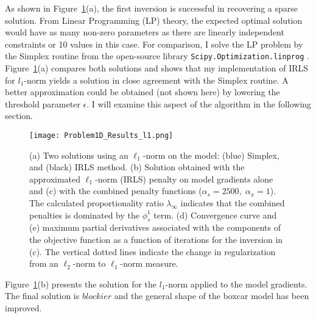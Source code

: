 As shown in Figure~\ref{Problem1D_l1Result}(a), the first inversion is successful in recovering a sparse solution. From Linear Programming (LP) theory, the expected optimal solution would have as many non-zero parameters as there are linearly independent constraints or 10 values in this case. For comparison, I solve the LP problem by the Simplex routine from the open-source library \texttt{Scipy.Optimization.linprog} \cite[]{Scipy2001}. Figure~\ref{Problem1D_l1Result}(a) compares both solutions and shows that my implementation of IRLS for $l_1$-norm yields a solution in close agreement with the Simplex routine. A better approximation could be obtained (not shown here) by lowering the threshold parameter $\epsilon$. I will examine this aspect of the algorithm in the following section.
\begin{figure}
\texttt{[image: Problem1D\_Results\_l1.png]}
\caption{(a) Two solutions using an $\ell_1$-norm on the model: (blue) Simplex, and (black) IRLS method. (b) Solution obtained with the approximated $\ell_1$-norm (IRLS) penalty on model gradients alone and (c) with the combined penalty functions ($\alpha_s=2500,\;\alpha_x = 1$). The calculated proportionality ratio $\lambda_\infty$ indicates that the combined penalties is dominated by the $\phi_s^1$ term. (d) Convergence curve and (e) maximum partial derivatives associated with the components of the objective function as a function of iterations for the inversion in (c). The vertical dotted lines indicate the change in regularization from an $\ell_2$-norm to $\ell_1$-norm measure.}
\label{Problem1D_l1Result}
\end{figure}
Figure~\ref{Problem1D_l1Result}(b) presents the solution for the $l_1$-norm applied to the model gradients. The final solution is $blockier$ and the general shape of the boxcar model has been improved. 


